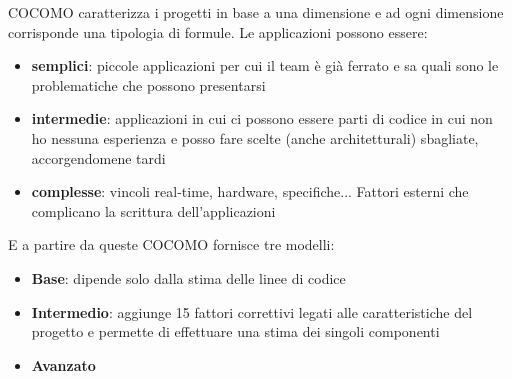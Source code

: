 COCOMO caratterizza i progetti in base a una dimensione e ad ogni dimensione corrisponde una tipologia di formule. Le applicazioni possono essere:
\begin{itemize}
    \item \textbf{semplici}:  piccole applicazioni per cui il team è già ferrato e sa quali sono le problematiche che possono presentarsi
    \item \textbf{intermedie}: applicazioni in cui ci possono essere parti di codice in cui non ho nessuna esperienza e posso fare scelte (anche architetturali) sbagliate, accorgendomene tardi
    \item \textbf{complesse}: vincoli real-time, hardware, specifiche... Fattori esterni che complicano la scrittura dell'applicazioni
\end{itemize}
E a partire da queste COCOMO fornisce tre modelli:
\begin{itemize}
    \item \textbf{Base}: dipende solo dalla stima delle linee di codice
    \item \textbf{Intermedio}: aggiunge 15 fattori correttivi legati alle caratteristiche del progetto e permette di effettuare una stima dei singoli componenti
    \item \textbf{Avanzato}
\end{itemize}
